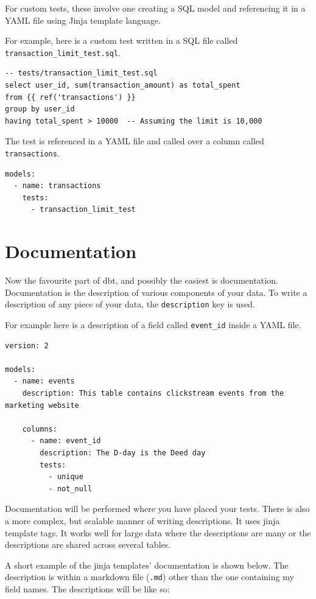 \documentclass[
]{book}
\begin{document}
For custom tests, these involve one creating a SQL model and referencing it in a YAML file using Jinja template language.

For example, here is a custom test written in a SQL file called \texttt{transaction\_limit\_test.sql}.

\begin{verbatim}
-- tests/transaction_limit_test.sql
select user_id, sum(transaction_amount) as total_spent
from {{ ref('transactions') }}
group by user_id
having total_spent > 10000  -- Assuming the limit is 10,000

\end{verbatim}

The test is referenced in a YAML file and called over a column called \texttt{transactions}.

\begin{verbatim}
models:
  - name: transactions
    tests:
      - transaction_limit_test
\end{verbatim}

\hypertarget{documentation}{%
\section{Documentation}\label{documentation}}

Now the favourite part of dbt, and possibly the easiest is documentation. Documentation is the description of various components of your data. To write a description of any piece of your data, the \texttt{description} key is used.

For example here is a description of a field called \texttt{event\_id} inside a YAML file.

\begin{verbatim}
version: 2

models:
  - name: events
    description: This table contains clickstream events from the marketing website

    columns:
      - name: event_id
        description: The D-day is the Deed day
        tests:
          - unique
          - not_null
\end{verbatim}

Documentation will be performed where you have placed your tests. There is also a more complex, but scalable manner of writing descriptions. It uses jinja template tags. It works well for large data where the descriptions are many or the descriptions are shared across several tables.

A short example of the jinja templates' documentation is shown below. The description is within a markdown file (\texttt{.md}) other than the one containing my field names. The descriptions will be like so:
\end{document}
